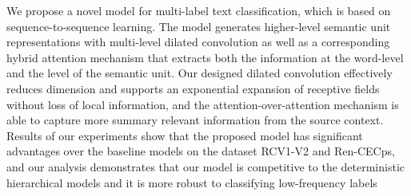 We propose a novel model for multi-label text classification, which is based on sequence-to-sequence learning. The model generates higher-level semantic unit representations with multi-level dilated convolution as well as a corresponding hybrid attention mechanism that extracts both the information at the word-level and the level of the semantic unit. Our designed dilated convolution effectively reduces dimension and supports an exponential expansion of receptive fields without loss of local information, and the attention-over-attention mechanism is able to capture more summary relevant information from the source context. Results of our experiments show that the proposed model has significant advantages over the baseline models on the dataset RCV1-V2 and Ren-CECps, and our analysis demonstrates that our model is competitive to the deterministic hierarchical models and it is more robust to classifying low-frequency labels
